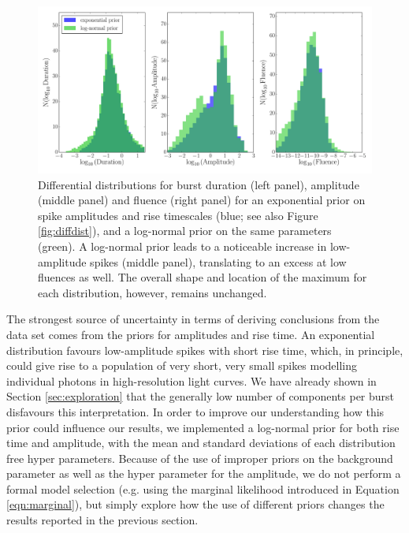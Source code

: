 \documentclass[12pt]{emulateapj}
\begin{document}
\begin{figure}[htbp]
\begin{center}
\includegraphics[width=\textwidth]{sgr1550_prior_diff_dist.pdf}
\caption{Differential distributions for burst duration (left panel), amplitude (middle panel) and fluence (right panel) for an exponential prior on spike 
amplitudes and rise timescales (blue; see also Figure \ref{fig:diffdist}),
and a log-normal prior on the same parameters (green). A log-normal prior leads to a noticeable increase in low-amplitude spikes (middle panel), translating
to an excess at low fluences as well. The overall shape and location of the maximum for each distribution, however, remains unchanged.}
\label{fig:diff_prior}
\end{center}
\end{figure}




The strongest source of uncertainty in terms of deriving conclusions from the data set comes from the priors for
amplitudes and rise time. An exponential distribution favours low-amplitude spikes with short rise time, which, in principle,
could give rise to a population of very short, very small spikes modelling individual photons in high-resolution light curves. We have already shown in 
Section \ref{sec:exploration} that the generally low number of components per burst disfavours this interpretation. In order
to improve our understanding how this prior could influence our results, we implemented a log-normal prior for both rise time
and amplitude, with the mean and standard deviations of each distribution free hyper parameters. Because of the use of improper priors
on the background parameter as well as the hyper parameter for the amplitude, we do not perform a formal model selection
(e.g. using the marginal likelihood introduced in Equation \ref{eqn:marginal}), but simply explore how the use of different priors
changes the results reported in the previous section.
\end{document}
